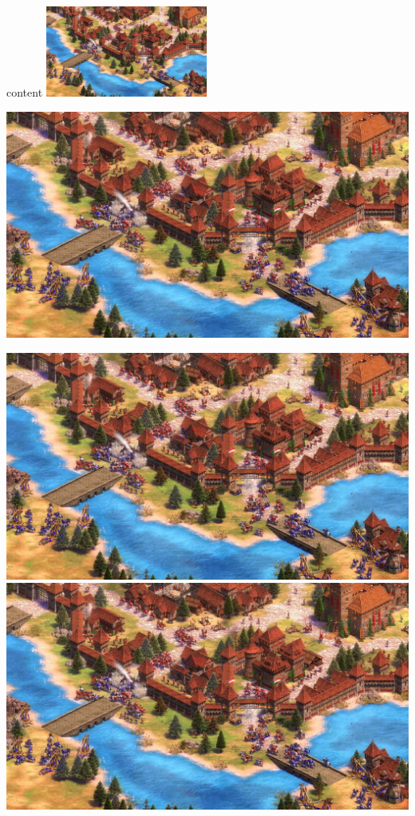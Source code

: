 \documentclass{article}
\begin{document}
	content
	\includegraphics[height=3cm]{aage.jpg}
	
	\includegraphics[scale=0.2]{aage.jpg}
	
	\includegraphics[clip=true, trim=15mm 5mm 7mm 3mm]{aage.jpg}
	\includegraphics[angle=170]{aage.jpg}
\end{document}
